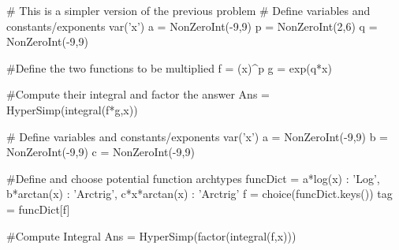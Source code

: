 

\begin{sagesilent}
# This is a simpler version of the previous problem
# Define variables and constants/exponents
var('x')
a = NonZeroInt(-9,9)
p = NonZeroInt(2,6)
q = NonZeroInt(-9,9)

#Define the two functions to be multiplied
f = (x)^p
g = exp(q*x)

#Compute their integral and factor the answer
Ans = HyperSimp(integral(f*g,x))

\end{sagesilent}



\begin{sagesilent}
# Define variables and constants/exponents
var('x')
a = NonZeroInt(-9,9)
b = NonZeroInt(-9,9)
c = NonZeroInt(-9,9)

#Define and choose potential function archtypes
funcDict = {
  a*log(x)      : 'Log',
  b*arctan(x)   : 'Arctrig',
  c*x*arctan(x) : 'Arctrig'
}
f = choice(funcDict.keys())
tag = funcDict[f]

#Compute Integral
Ans = HyperSimp(factor(integral(f,x)))
\end{sagesilent}


